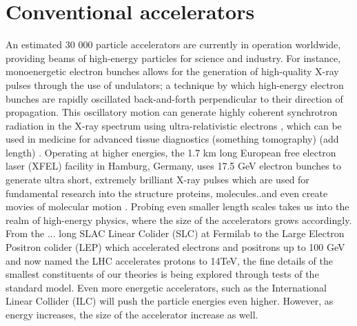 \documentclass[%
 onecolumn,notitlepage,
 amsmath,amssymb,
 aps,
 longbibliography
]{revtex4-1}
\begin{document}
\section{Conventional accelerators}\vspace{-8pt}
An estimated 30 000 particle accelerators are currently in operation worldwide, 
providing beams of high-energy particles for science and industry. 
For instance, monoenergetic electron bunches allows for the generation of high-quality X-ray pulses through the use of undulators; a technique by which high-energy electron bunches are rapidly oscillated back-and-forth perpendicular to their direction of propagation. This oscillatory motion can generate highly coherent synchrotron radiation in the X-ray spectrum using  ultra-relativistic electrons , which can be used in medicine for advanced tissue diagnostics  (something tomography) (add length) . Operating at higher energies, the 1.7 km long European free electron laser (XFEL) facility in Hamburg, Germany, uses 17.5 GeV electron bunches to generate ultra short, extremely brilliant X-ray pulses which are used for fundamental research into the structure proteins, molecules..and even create movies of molecular motion \cite{xfel}. Probing even smaller length scales takes us into the realm of high-energy physics, where the size of the accelerators grows accordingly. From the ... long SLAC Linear Colider (SLC) at Fermilab to the Large Electron Positron colider (LEP) which accelerated electrons and positrons up to 100 GeV and now named the LHC accelerates protons to 14TeV, the fine details of the smallest constituents of our theories is being explored through tests of the standard model. Even more energetic accelerators, such as the International Linear Collider (ILC) will push the particle energies even higher. However, as energy increases, the size of the accelerator increase as well. \\
\end{document}
